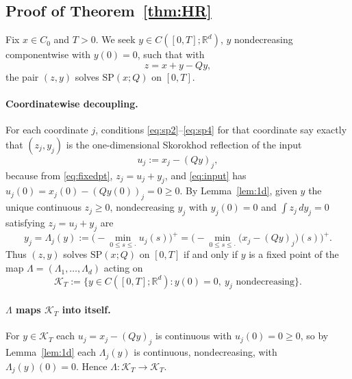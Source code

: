 \documentclass{amsart}
\theoremstyle{definition}
\theoremstyle{remark}
\newcommand{\R}{\mathbb{R}}
\begin{document}
\subsection{Proof of Theorem~\ref{thm:HR}}

Fix $x\in C_0$ and $T>0$. We seek $y\in C([0,T];\R^d)$, $y$ nondecreasing
componentwise with $y(0)=0$, such that with
\begin{equation}\label{eq:fixedpt}
  z=x+y-Qy,
\end{equation}
the pair $(z,y)$ solves $\mathrm{SP}(x;Q)$ on $[0,T]$.

\paragraph{Coordinatewise decoupling.}
For each coordinate $j$, conditions \eqref{eq:sp2}--\eqref{eq:sp4} for that
coordinate say exactly that $(z_j,y_j)$ is the one-dimensional Skorokhod
reflection of the input
\begin{equation}\label{eq:input}
  u_j:=x_j-(Qy)_j,
\end{equation}
because from \eqref{eq:fixedpt}, $z_j=u_j+y_j$, and \eqref{eq:input} has
$u_j(0)=x_j(0)-(Qy(0))_j=0\ge0$. By Lemma~\ref{lem:1d}, given $y$ the unique
continuous $z_j\ge0$, nondecreasing $y_j$ with $y_j(0)=0$ and
$\int z_j\,dy_j=0$ satisfying $z_j=u_j+y_j$ are
\begin{equation}\label{eq:Tdef}
  y_j=\Lambda_j(y):=\Big({-}\!\min_{0\le s\le\cdot}u_j(s)\Big)^+
  =\Big({-}\!\min_{0\le s\le\cdot}\big(x_j-(Qy)_j\big)(s)\Big)^+ .
\end{equation}
Thus $(z,y)$ solves $\mathrm{SP}(x;Q)$ on $[0,T]$ if and only if $y$ is a fixed
point of the map $\Lambda=(\Lambda_1,\dots,\Lambda_d)$ acting on
\[
  \mathcal K_T:=\{y\in C([0,T];\R^d):y(0)=0,\ y_j\text{ nondecreasing}\}.
\]

\paragraph{$\Lambda$ maps $\mathcal K_T$ into itself.}
For $y\in\mathcal K_T$ each $u_j=x_j-(Qy)_j$ is continuous with
$u_j(0)=0\ge0$, so by Lemma~\ref{lem:1d} each $\Lambda_j(y)$ is continuous,
nondecreasing, with $\Lambda_j(y)(0)=0$. Hence $\Lambda:\mathcal K_T\to\mathcal
K_T$.
\end{document}
